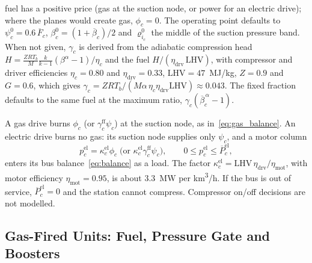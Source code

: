fuel has a positive price (gas at the suction node, or power for an
electric drive); where the planes would create gas, $\phi_c = 0$.  The
operating point defaults to $\psi^0_c = 0.6\,\overline{F}_c$,
$\beta^0_c = (1 + \overline{\beta}_c)/2$ and $\varrho^0_{i_c}$ the
middle of the suction pressure band.  When not given,
$\gamma_c$ is derived from the adiabatic compression head
$H = \frac{Z R T_b}{M}\frac{k}{k-1}(\beta^{\alpha}-1)/\eta_c$ and the
fuel $H/(\eta_{\mathrm{drv}}\,\mathrm{LHV})$, with compressor and driver
efficiencies $\eta_c = 0.80$ and $\eta_{\mathrm{drv}} = 0.33$,
$\mathrm{LHV} = 47$~MJ/kg, $Z = 0.9$ and $G = 0.6$, which gives
$\gamma_c = Z R T_b/(M \alpha\, \eta_c \eta_{\mathrm{drv}}\mathrm{LHV})
\approx 0.043$.  The fixed fraction defaults to the same
fuel at the maximum ratio, $\gamma_c(\overline{\beta}_c^{\,\alpha}-1)$.

A gas drive burns $\phi_c$ (or $\gamma^{\mathrm{ff}}_c\psi_c$) at the
suction node, as in~\eqref{eq:gas_balance}.  An electric drive burns no
gas: its suction node supplies only $\psi_c$, and a motor column
\begin{equation}
\label{eq:gas_motor}
p^{\mathrm{el}}_c = \kappa^{\mathrm{el}}_c \phi_c
\;\bigl(\text{or } \kappa^{\mathrm{el}}_c \gamma^{\mathrm{ff}}_c \psi_c\bigr),
\qquad 0 \leq p^{\mathrm{el}}_c \leq \overline{P}^{\mathrm{el}}_c ,
\end{equation}
enters its bus balance~\eqref{eq:balance} as a load.  The factor
$\kappa^{\mathrm{el}}_c =
\mathrm{LHV}\,\eta_{\mathrm{drv}}/\eta_{\mathrm{mot}}$, with motor
efficiency $\eta_{\mathrm{mot}} = 0.95$, is about 3.3~MW per
km\textsuperscript{3}/h.  If the bus is out of service,
$\overline{P}^{\mathrm{el}}_c = 0$ and the station cannot compress.  Compressor on/off decisions are not
modelled.

\subsection{Gas-Fired Units: Fuel, Pressure Gate and Boosters}
\label{sec:gas_turbine}

